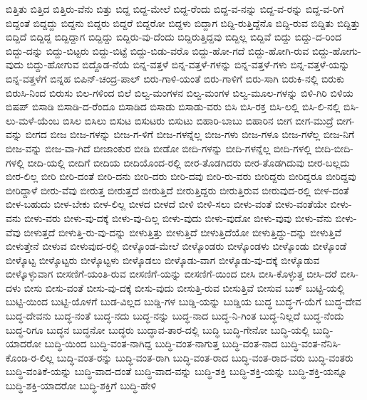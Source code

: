 {ಬಿತ್ತಿತು
ಬಿತ್ತಿದ
ಬಿತ್ತಿರು-ವೆನು
ಬಿತ್ತು
ಬಿದ್ದ
ಬಿದ್ದ-ಮೇಲೆ
ಬಿದ್ದ-ರೆಂದು
ಬಿದ್ದ-ವ-ನನ್ನು
ಬಿದ್ದ-ವ-ರನ್ನು
ಬಿದ್ದ-ವ-ರಿಗೆ
ಬಿದ್ದಂತೆ
ಬಿದ್ದದ್ದು
ಬಿದ್ದನು
ಬಿದ್ದರು
ಬಿದ್ದರೆ
ಬಿದ್ದರೋ
ಬಿದ್ದಳು
ಬಿದ್ದಾಗ
ಬಿದ್ದಿ-ರುತ್ತಿದ್ದೆನೊ
ಬಿದ್ದಿ-ರುವ
ಬಿದ್ದಿತು
ಬಿದ್ದಿತ್ತು
ಬಿದ್ದಿದೆ
ಬಿದ್ದಿದ್ದ
ಬಿದ್ದಿದ್ದಾಗ
ಬಿದ್ದಿದ್ದು
ಬಿದ್ದಿರು-ವು-ದೆಂದು
ಬಿದ್ದಿರುತ್ತಿದ್ದವು
ಬಿದ್ದಿಲ್ಲ
ಬಿದ್ದಿವೆ
ಬಿದ್ದು
ಬಿದ್ದು-ದ-ರಿಂದ
ಬಿದ್ದು-ದನ್ನು
ಬಿದ್ದು-ಬಿಟ್ಟರು
ಬಿದ್ದು-ಬಿಟ್ಟೆ
ಬಿದ್ದು-ಬಿಡು-ವರೊ
ಬಿದ್ದು-ಹೋ-ಗದೆ
ಬಿದ್ದು-ಹೋಗಿ-ರುವ
ಬಿದ್ದು-ಹೋಗು-ವುದು
ಬಿದ್ದು-ಹೋಗುವ
ಬಿದ್ದೊಡ-ನೆಯೆ
ಬಿನ್ನ-ವತ್ತಳೆ
ಬಿನ್ನ-ವತ್ತಳೆ-ಗಳನ್ನು
ಬಿನ್ನ-ವತ್ತಳೆ-ಗಳು
ಬಿನ್ನ-ವತ್ತಳೆ-ಯನ್ನು
ಬಿನ್ನ-ವತ್ತಳೆಗೆ
ಬಿನ್ನಹ
ಬಿಪಿನ್-ಚಂದ್ರ-ಪಾಲ್
ಬಿರು-ಗಾಳಿ-ಯಂತೆ
ಬಿರು-ಗಾಳಿಗೆ
ಬಿರು-ಸಾಗಿ
ಬಿರುಕಿ-ನಲ್ಲಿ
ಬಿರುಕು
ಬಿರುಸಿ-ನಿಂದ
ಬಿರುಸು
ಬಿಲ-ಗಳಿಂದ
ಬಿಲೆ
ಬಿಲ್ವ-ಮಂಗಳನ
ಬಿಲ್ವ-ಮಂಗಳ
ಬಿಲ್ವ-ಮೂಲ-ಗಳನ್ನು
ಬಿಳಿ-ಗಿರಿ
ಬಿಳಿಯ
ಬಿಷಪ್
ಬಿಸಾಡಿ
ಬಿಸಾಡಿ-ದ-ರೆಂದೂ
ಬಿಸಾಡಿದ
ಬಿಸಾಡು
ಬಿಸಾಡು-ವರು
ಬಿಸಿ
ಬಿಸಿ-ರಕ್ತ
ಬಿಸಿ-ಲಲ್ಲಿ
ಬಿಸಿ-ಲಿ-ನಲ್ಲಿ
ಬಿಸಿ-ಲು-ಮಳೆ-ಯೆಂಬ
ಬಿಸಿಲ
ಬಿಸಿಲು
ಬಿಸುಟ
ಬಿಸುಟರು
ಬಿಸುಟು
ಬಿಹಾರಿ-ಬಾಬು
ಬಿಹಾರಿನ
ಬೀಗ
ಬೀಗ-ಮುದ್ರೆ
ಬೀಗ-ವನ್ನು
ಬೀಗದ
ಬೀಜ
ಬೀಜ-ಗಳನ್ನು
ಬೀಜ-ಗ-ಳಿಗೆ
ಬೀಜ-ಗಳನ್ನೆಲ್ಲ
ಬೀಜ-ಗಳು
ಬೀಜ-ಗಳೂ
ಬೀಜ-ಗಳೆಲ್ಲ
ಬೀಜ-ನಿಗೆ
ಬೀಜ-ವನ್ನು
ಬೀಜ-ವಾ-ಗಿದೆ
ಬೀಜಾಂಕುರ
ಬೀಡಿ
ಬೀಡೋ
ಬೀದಿ-ಗಳನ್ನು
ಬೀದಿ-ಗಳನ್ನೆಲ್ಲ
ಬೀದಿ-ಗಳಲ್ಲಿ
ಬೀದಿ-ಬೀದಿ-ಗಳಲ್ಲಿ
ಬೀದಿ-ಯಲ್ಲಿ
ಬೀದಿಗೆ
ಬೀದಿಯ
ಬೀದಿಯೊಂದ-ರಲ್ಲಿ
ಬೀರ-ತೊಡಗಿದರು
ಬೀರ-ತೊಡಗಿದುವು
ಬೀರ-ಬಲ್ಲದು
ಬೀರ-ಲಿಲ್ಲ
ಬೀರಿ
ಬೀರಿ-ದಂತೆ
ಬೀರಿ-ದನು
ಬೀರಿ-ದರು
ಬೀರಿ-ದವು
ಬೀರಿ-ರು-ವರು
ಬೀರಿದ್ದರು
ಬೀರಿದ್ದರೂ
ಬೀರಿದ್ದವು
ಬೀರಿದ್ದಾಳೆ
ಬೀರು-ವೆವು
ಬೀರುತ್ತ
ಬೀರುತ್ತದೆ
ಬೀರುತ್ತಿದೆ
ಬೀರುತ್ತಿದ್ದರು
ಬೀರುತ್ತಿರುವ
ಬೀರುವುದ-ರಲ್ಲಿ
ಬೀಳ-ದಂತೆ
ಬೀಳ-ಬಹುದು
ಬೀಳ-ಬೇಕು
ಬೀಳ-ಲಿಲ್ಲ
ಬೀಳದ
ಬೀಳದೆ
ಬೀಳಿ
ಬೀಳಿ-ಸಲು
ಬೀಳು-ವಂತೆ
ಬೀಳು-ವಂತೆಯೇ
ಬೀಳು-ವನು
ಬೀಳು-ವರು
ಬೀಳು-ವು-ದಕ್ಕೆ
ಬೀಳು-ವು-ದಿಲ್ಲ
ಬೀಳು-ವುದು
ಬೀಳು-ವುದೋ
ಬೀಳು-ವುವು
ಬೀಳು-ವೆನು
ಬೀಳು-ವೆವು
ಬೀಳುತ್ತದೆ
ಬೀಳುತ್ತಿ-ರು-ವು-ದನ್ನು
ಬೀಳುತ್ತಿತ್ತು
ಬೀಳುತ್ತಿದೆ
ಬೀಳುತ್ತಿದೆಯೋ
ಬೀಳುತ್ತಿದ್ದು-ದನ್ನು
ಬೀಳುತ್ತಿವೆ
ಬೀಳುತ್ತೇನೆ
ಬೀಳುವ
ಬೀಳುವುದ-ರಲ್ಲಿ
ಬೀಳ್ಕೊಂಡ-ಮೇಲೆ
ಬೀಳ್ಕೊಂಡರು
ಬೀಳ್ಕೊಂಡಳು
ಬೀಳ್ಕೊಂಡು
ಬೀಳ್ಕೊಂಡೆ
ಬೀಳ್ಕೊಟ್ಟ
ಬೀಳ್ಕೊಟ್ಟರು
ಬೀಳ್ಕೊಟ್ಟಳು
ಬೀಳ್ಕೊಡಲು
ಬೀಳ್ಕೊಡು-ವಾಗ
ಬೀಳ್ಕೊಡು-ವು-ದಕ್ಕೆ
ಬೀಳ್ಕೊಡುವ
ಬೀಳ್ಕೊಳ್ಳುವಾಗ
ಬೀಸಣಿಗೆ-ಯಂತಿ-ರುವ
ಬೀಸಣಿಗೆ-ಯನ್ನು
ಬೀಸಣಿಗೆ-ಯಿಂದ
ಬೀಸಿ
ಬೀಸಿ-ಕೊಳ್ಳುತ್ತ
ಬೀಸಿ-ದರೆ
ಬೀಸಿ-ದಳು
ಬೀಸು
ಬೀಸು-ವಂತೆ
ಬೀಸು-ವು-ದಕ್ಕೆ
ಬೀಸು-ವುದು
ಬೀಸುತ್ತಿ-ರುವ
ಬೀಸುತ್ತಿವೆ
ಬೀಸುವ
ಬುಕ್
ಬುಟ್ಟಿ-ಯಲ್ಲಿ
ಬುಟ್ಟಿ-ಯಿಂದ
ಬುಟ್ಟಿ-ಯೊಳಗೆ
ಬುಡ-ವಿಲ್ಲದ
ಬುಡ್ಡಿ-ಗಳ
ಬುಡ್ಡಿ-ಯನ್ನು
ಬುಡ್ಡಿಯ
ಬುದ್ಧ
ಬುದ್ಧ-ಗ-ಯೆಗೆ
ಬುದ್ಧ-ದೇವ
ಬುದ್ಧ-ದೇವನು
ಬುದ್ಧ-ನಂತೆ
ಬುದ್ಧ-ನದು
ಬುದ್ಧ-ನನ್ನು
ಬುದ್ಧ-ನಾದ
ಬುದ್ಧ-ನಿ-ಗಿಂತ
ಬುದ್ಧ-ನಿಲ್ಲದೆ
ಬುದ್ಧ-ನೆಂದು
ಬುದ್ಧ-ರಿಗೂ
ಬುದ್ಧನ
ಬುದ್ಧನೋ
ಬುದ್ಧರು
ಬುದ್ಧಾವ-ತಾರ-ದಲ್ಲಿ
ಬುದ್ಧಿ
ಬುದ್ಧಿ-ಗೇನೋ
ಬುದ್ಧಿ-ಯಲ್ಲಿ
ಬುದ್ಧಿ-ಯಾದರೋ
ಬುದ್ಧಿ-ಯಿಂದ
ಬುದ್ಧಿ-ವಂತ-ನಾಗಿದ್ದ
ಬುದ್ಧಿ-ವಂತ-ನಾಗುತ್ತ
ಬುದ್ಧಿ-ವಂತ-ನಾದ
ಬುದ್ಧಿ-ವಂತ-ನೆನಿಸಿ-ಕೊಂಡಿ-ರ-ಲಿಲ್ಲ
ಬುದ್ಧಿ-ವಂತ-ರನ್ನು
ಬುದ್ಧಿ-ವಂತ-ರಾಗಿ
ಬುದ್ಧಿ-ವಂತ-ರಾದ
ಬುದ್ಧಿ-ವಂತ-ರಾದ-ವರು
ಬುದ್ಧಿ-ವಂತರು
ಬುದ್ಧಿ-ವಂತಿಕೆ-ಯನ್ನು
ಬುದ್ಧಿ-ವಾದ-ದಂತೆ
ಬುದ್ಧಿ-ವಾದ-ವನ್ನು
ಬುದ್ಧಿ-ಶಕ್ತಿ
ಬುದ್ಧಿ-ಶಕ್ತಿ-ಯನ್ನು
ಬುದ್ಧಿ-ಶಕ್ತಿ-ಯನ್ನೂ
ಬುದ್ಧಿ-ಶಕ್ತಿ-ಯಾದರೋ
ಬುದ್ಧಿ-ಶಕ್ತಿಗೆ
ಬುದ್ಧಿ-ಹೇಳಿ
}
